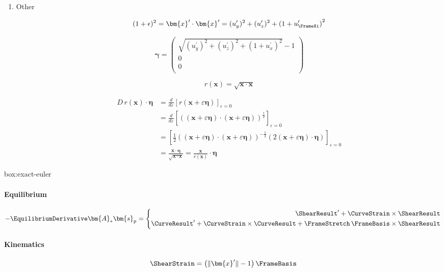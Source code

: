 \begin{enumerate}[label=(\roman*)]
\item Other

$$
(1+\epsilon)^2=\bm{x}^{\prime}\cdot\bm{x}^{\prime} =  (u_y^{\prime})^2 + (u_z^{\prime})^2 + \left(1+u_{\FrameXi}^{\prime}\right)^2
$$

\begin{equation}
\bm{\gamma}
=\begin{pmatrix}
\sqrt{(u_y^{\prime})^2+(u_z^{\prime})^2+\left(1+u_x^{\prime}\right)^2} - 1 \\
0 \\
0 \\
\end{pmatrix}
\end{equation}

$$
r(\bm{x})=\sqrt{\bm{x} \cdot \bm{x}}
$$


$$
\begin{aligned}
D\, r(\bm{x}) \cdot \bm{\eta} & =\frac{d}{d \varepsilon}[r(\bm{x}+\varepsilon \bm{\eta})]_{\varepsilon=0} \\
& =\frac{d}{d \varepsilon}\left[((\bm{x}+\varepsilon \bm{\eta}) \cdot(\bm{x}+\varepsilon \bm{\eta}))^{\frac{1}{2}}\right]_{\varepsilon=0} \\
& =\left[\frac{1}{2}((\bm{x}+\varepsilon \bm{\eta}) \cdot(\bm{x}+\varepsilon \bm{\eta}))^{-\frac{1}{2}}(2(\bm{x}+\varepsilon \bm{\eta}) \cdot \bm{\eta})\right]_{\varepsilon=0} \\
& =\frac{\bm{x} \cdot \bm{\eta}}{\sqrt{\bm{x} \cdot \bm{x}}}=\frac{\bm{x}}{r(\bm{x})} \cdot \bm{\eta}
\end{aligned}
$$

\end{enumerate}

\begin{ambox}{box:exact-euler}

\paragraph{Equilibrium}
\begin{equation*}
-\EquilibriumDerivative \bm{A}_* \bm{s}_{\mathrm{p}} = 
\left\{
\begin{aligned}
\ShearResult^{\prime} + \CurveStrain \times \ShearResult \\
\CurveResult^{\prime} + \CurveStrain \times \CurveResult + \FrameStretch \, \FrameBasis \times \ShearResult 
\end{aligned}
\right.
\end{equation*}

\paragraph{Kinematics}
\begin{equation*}
\ShearStrain = \left( \|\bm{x}^{\prime}\| - 1 \right) \FrameBasis
\end{equation*}

\end{ambox}
